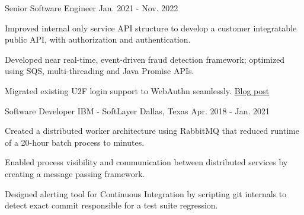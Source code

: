 \begin{cventries}
    \cventry
    {Senior Software Engineer}
    {} %
    {} %
    {Jan. 2021 - Nov. 2022}
    {
        \begin{cvitems}
            \item {Improved internal only service API structure to develop a customer integratable public API, with authorization and authentication.}
            \item {Developed near real-time, event-driven fraud detection framework; optimized using SQS, multi-threading and Java Promise APIs.}
            \item {Migrated existing U2F login support to WebAuthn seamlessly. \href{https://www.jacobcasper.com/u2f2webauthn.html}{Blog post}}
        \end{cvitems}
    }

	\cventry
	{Software Developer}
	{IBM - SoftLayer}
	{Dallas, Texas}
	{Apr. 2018 - Jan. 2021}
	{
		\begin{cvitems}
			\item {Created a distributed worker architecture using RabbitMQ that reduced runtime of a 20-hour batch process to minutes.}
			\item {Enabled process visibility and communication between distributed services by creating a message passing framework.}
			\item {Designed alerting tool for Continuous Integration by scripting git internals to detect exact commit responsible for a test suite regression.}
		\end{cvitems}
	}
	

\end{cventries}
